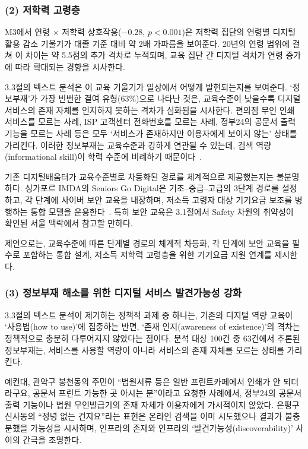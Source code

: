 \subsubsection*{(2) 저학력 고령층}

M3에서 연령 $\times$ 저학력 상호작용($-0.28$, $p < 0.001$)은 저학력 집단의 연령별 디지털 활용 감소 기울기가 대졸 기준 대비 약 2배 가파름을 보여준다. 20년의 연령 범위에 걸쳐 이 차이는 약 5.5점의 추가 격차로 누적되며, 교육 집단 간 디지털 격차가 연령 증가에 따라 확대되는 경향을 시사한다.

3.3절의 텍스트 분석은 이 교육 기울기가 일상에서 어떻게 발현되는지를 보여준다. `정보부재'가 가장 빈번한 결여 유형(63\%)으로 나타난 것은, 교육수준이 낮을수록 디지털 서비스의 존재 자체를 인지하지 못하는 격차가 심화됨을 시사한다. 편의점 무인 인쇄 서비스를 모르는 사례, ISP 고객센터 전화번호를 모르는 사례, 정부24의 공문서 출력 기능을 모르는 사례 등은 모두 `서비스가 존재하지만 이용자에게 보이지 않는' 상태를 가리킨다. 이러한 정보부재는 교육수준과 강하게 연관될 수 있는데, 검색 역량(informational skill)이 학력 수준에 비례하기 때문이다~\citep{Hargittai2010}.

기존 디지털배움터가 교육수준별로 차등화된 경로를 체계적으로 제공했는지는 불분명하다. 싱가포르 IMDA의 Seniors Go Digital은 기초--중급--고급의 3단계 경로를 설정하고, 각 단계에 사이버 보안 교육을 내장하며, 저소득 고령자 대상 기기\textperiodcentered{}요금 보조를 병행하는 통합 모델을 운용한다~\citep{IMDA2020, CSASingapore2023}. 특히 보안 교육은 3.1절에서 Safety 차원의 취약성이 확인된 서울 맥락에서 참고할 만하다.

제언으로는, 교육수준에 따른 단계별 경로의 체계적 차등화, 각 단계에 보안 교육을 필수로 포함하는 통합 설계, 저소득 저학력 고령층을 위한 기기\textperiodcentered{}요금 지원 연계를 제시한다.

\subsubsection*{(3) 정보부재 해소를 위한 디지털 서비스 발견가능성 강화}

3.3절의 텍스트 분석이 제기하는 정책적 과제 중 하나는, 기존의 디지털 역량 교육이 `사용법(how to use)'에 집중하는 반면, `존재 인지(awareness of existence)'의 격차는 정책적으로 충분히 다루어지지 않았다는 점이다. 분석 대상 100건 중 63건에서 추론된 정보부재는, 서비스를 사용할 역량이 아니라 서비스의 존재 자체를 모르는 상태를 가리킨다.

예컨대, 관악구 봉천동의 주민이 ``법원서류 등은 일반 프린트카페에서 인쇄가 안 되더라구요, 공문서 프린트 가능한 곳 아시는 분''이라고 요청한 사례에서, 정부24의 공문서 출력 기능이나 법원 무인발급기의 존재 자체가 이용자에게 가시적이지 않았다. 은평구 신사동의 ``정녕 없는 건지요''라는 표현은 온라인 검색을 이미 시도했으나 결과가 불충분했을 가능성을 시사하며, 인프라의 존재와 인프라의 `발견가능성(discoverability)' 사이의 간극을 조명한다.

